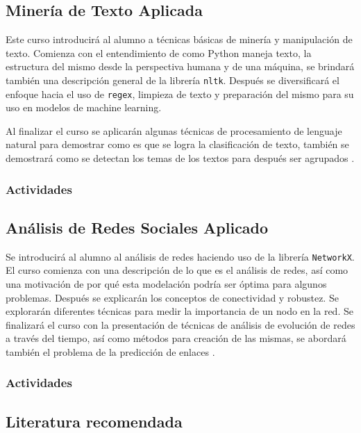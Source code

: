 \documentclass{article}
\begin{document}
        \subsection{Minería de Texto Aplicada}

            Este curso introducirá al alumno a técnicas básicas de minería y manipulación de texto. Comienza con el entendimiento de como Python maneja texto, la estructura del mismo desde la perspectiva humana y de una máquina, se brindará también una descripción general de la librería \texttt{nltk}. Después se diversificará el enfoque hacia el uso de \texttt{regex}, limpieza de texto y preparación del mismo para su uso en modelos de machine learning.

            Al finalizar el curso se aplicarán algunas técnicas de procesamiento de lenguaje natural para demostrar como es que se logra la clasificación de texto, también se demostrará como se detectan los temas de los textos para después ser agrupados \cite{text-mining}.

            \subsubsection{Actividades}

        \subsection{Análisis de Redes Sociales Aplicado}

            Se introducirá al alumno al análisis de redes haciendo uso de la librería \texttt{NetworkX}. El curso comienza con una descripción de lo que es el análisis de redes, así como una motivación de por qué esta modelación podría ser óptima para algunos problemas. Después se explicarán los conceptos de conectividad y robustez. Se explorarán diferentes técnicas para medir la importancia de un nodo en la red. Se finalizará el curso con la presentación de técnicas de análisis de evolución de redes a través del tiempo, así como métodos para creación de las mismas, se abordará también el problema de la predicción de enlaces \cite{network-analysis}.

            \subsubsection{Actividades}
        
        \subsection{Literatura recomendada}
\end{document}
